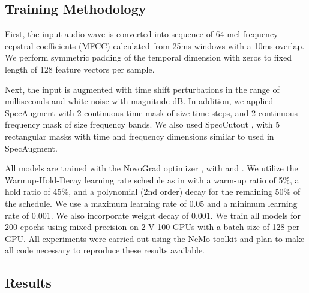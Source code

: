 \documentclass[a4paper]{article}
\begin{document}
\subsection{Training Methodology}

First, the input audio wave is converted into sequence of 64  mel-frequency cepstral coefficients (MFCC) calculated from 25ms windows with a 10ms overlap. We perform symmetric padding of the temporal dimension with zeros to fixed length of 128 feature vectors per sample. 

Next, the input is augmented with time shift perturbations in the range of  milliseconds and white noise with magnitude  dB. In addition, we applied SpecAugment \cite{park2019} with 2 continuous time mask of size  time steps, and 2 continuous frequency mask of size  frequency bands. We also used SpecCutout \cite{devries2017specutout}, with 5 rectangular masks with time and frequency dimensions similar to used in SpecAugment. 

All models are trained with the NovoGrad optimizer \cite{novograd2019}, with  and . We utilize the Warmup-Hold-Decay learning rate schedule as in \cite{he2019bag} with a warm-up ratio of 5\%, a hold ratio of 45\%, and a polynomial (2nd order) decay for the remaining 50\% of the schedule.  We use a maximum learning rate of 0.05 and a minimum learning rate of 0.001. We also incorporate weight decay of 0.001. 
We train all models for 200 epochs using mixed precision  \cite{micikevicius2017mixed} on 2 V-100 GPUs with a batch size of 128 per GPU. 
All experiments were carried out using the NeMo toolkit \cite{nemo2019} and plan to make all code necessary to reproduce these results available.


\subsection{Results}
\end{document}
